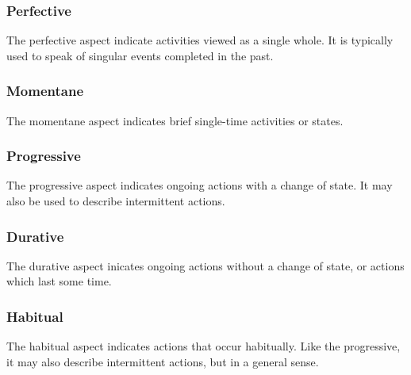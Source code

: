 \documentclass[grammar]{subfiles}
\begin{document}
  \subsubsection{Perfective}
  \label{vm:sssec_perfective}

  The perfective aspect indicate activities viewed as a single whole.
  It is typically used to speak of singular events completed in the past.


  \subsubsection{Momentane}
  \label{vm:sssec_momentane}

  The momentane aspect indicates brief single-time activities or states.


  \subsubsection{Progressive}
  \label{vm:sssec_progressive}

  The progressive aspect indicates ongoing actions with a change of state.  It
  may also be used to describe intermittent actions.


  \subsubsection{Durative}
  \label{vm:sssec_durative}

  The durative aspect inicates ongoing actions without a change of state, or actions which last some time.


  \subsubsection{Habitual}
  \label{vm:sssec_habitual}

  The habitual aspect indicates actions that occur habitually.  Like the progressive, it may also describe intermittent actions, but in a general sense.   

\end{document}
